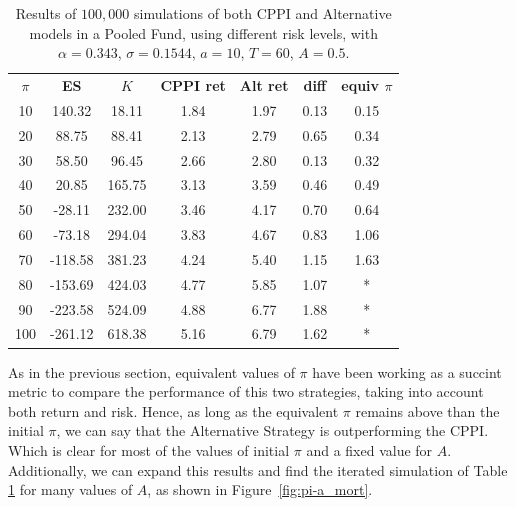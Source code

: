 \begin{table}[h]
\centering
\caption{Results of $100,000$ simulations of both CPPI and Alternative models in a Pooled Fund, using different risk levels, with $\alpha = 0.343$, $\sigma = 0.1544$, $a = 10$, $T = 60$, $A = 0.5$.}
\label{tab:cppi_alt_mort}
\begin{tabular}{ccccccc}
\textbf{$\pi$} & \textbf{ES } & \textbf{$K$} & \textbf{CPPI ret} & \textbf{Alt ret} & \textbf{diff}  & \textbf{equiv $\pi$}\\
10  & 140.32  & 18.11 & 1.84 & 1.97 & 0.13 & 0.15 \\
20  & 88.75  & 88.41 & 2.13 & 2.79 & 0.65 & 0.34 \\
30  & 58.50  & 96.45 & 2.66 & 2.80 & 0.13 & 0.32 \\
40  & 20.85  & 165.75  & 3.13 & 3.59 & 0.46 & 0.49 \\
50  & -28.11 & 232.00  & 3.46 & 4.17 & 0.70 & 0.64 \\
60  & -73.18 & 294.04 & 3.83 & 4.67 & 0.83 & 1.06 \\
70  & -118.58 & 381.23 & 4.24 & 5.40 & 1.15 & 1.63 \\
80  & -153.69 & 424.03 & 4.77 & 5.85  & 1.07 & *                 \\
90  & -223.58 & 524.09 & 4.88 & 6.77 & 1.88 & *                 \\
100 & -261.12   & 618.38 & 5.16 & 6.79 & 1.62 & *

\end{tabular}
\end{table}



As in the previous section, equivalent values of $\pi$ have been working as a succint metric to compare the performance of this two strategies, taking into account both return and risk. Hence, as long as the equivalent $\pi$ remains above than the initial $\pi$, we can say that the Alternative Strategy is outperforming
the CPPI. Which is clear for most of the values of initial $\pi$ and a fixed value for $A$. Additionally, we can expand this results and find the iterated simulation of Table \ref{tab:cppi_alt_mort} for many values of $A$, as shown in Figure~\ref{fig:pi-a_mort}.

